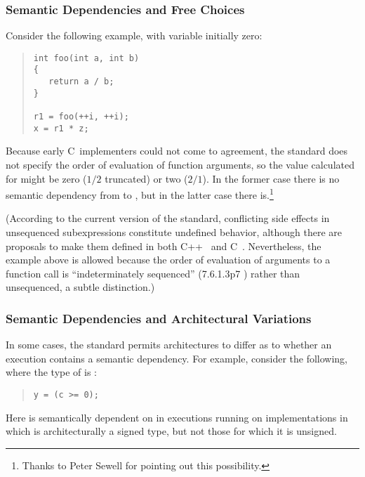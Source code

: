 \subsubsection{Semantic Dependencies and Free Choices}
\label{sec:Semantic Dependencies and Free Choices}

Consider the following example, with variable  initially zero:
\begin{quote}
\begin{verbatim}
int foo(int a, int b)
{
   return a / b;
}

r1 = foo(++i, ++i);
x = r1 * z;
\end{verbatim}
\end{quote}
Because early C~implementers could not come to agreement, the standard
does not specify the order of evaluation of function arguments, so
the value calculated for  might be zero ($1/2$ truncated) or two
($2/1$).
In the former case there is no semantic dependency from  to ,
but in the latter case there is.\footnote{
	Thanks to Peter Sewell for pointing out this possibility.}

(According to the current version of the standard, conflicting side effects
in unsequenced subexpressions constitute undefined behavior,
although there are proposals to make them defined in both
C++~\cite{GabrielDosReis2016P0145r3}
and C~\cite{AlexCeleste2023N3203}.
Nevertheless, the example above is allowed because the order of evaluation
of arguments to a function call is ``indeterminately sequenced''
(7.6.1.3p7 ) rather than unsequenced, a subtle distinction.)

\subsubsection{Semantic Dependencies and Architectural Variations}
\label{sec:Semantic Dependencies and Architectural Variations}

In some cases, the standard permits architectures to differ as to whether
an execution contains a semantic dependency.
For example, consider the following, where the type of  is :
\begin{quote}
\begin{verbatim}
y = (c >= 0);
\end{verbatim}
\end{quote}
Here  is semantically dependent on  in executions
running on implementations in
which  is architecturally a signed type,
but not those for which it is unsigned.

